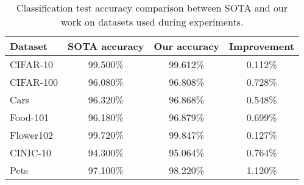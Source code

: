 \documentclass[review]{elsarticle}
\begin{document}
\begin{table*}[h]
\caption{Classification test accuracy comparison between SOTA and our work on datasets used during experiments.}
\newcommand\T{\rule{0pt}{2.5ex}}
\begin{center}
\begin{tabular}{lccc}
{\bf Dataset} &  {\bf SOTA accuracy} & {\bf Our accuracy}  & {\bf Improvement}\\
    \hline
    \T
    CIFAR-10 \cite{vith14} & 99.500\% & 99.612\% & 0.112\%\\
    CIFAR-100 \cite{SAM} & 96.080\% & 96.808\% & 0.728\%\\
    Cars \cite{tresentlv2} & 96.320\% & 96.868\% & 0.548\%\\
    Food-101 \cite{SAM} & 96.180\% & 96.879\% & 0.699\%\\
    Flower102 \cite{cvt24} & 99.720\% & 99.847\% & 0.127\%\\
    CINIC-10 \cite{NATm3} & 94.300\% & 95.064\% & 0.764\%\\
    Pets \cite{SAM} & 97.100\% & 98.220\% & 1.120\%
\end{tabular}
\end{center}
\label{tab:results}
\end{table*}
\end{document}
